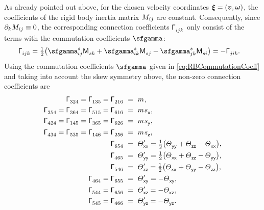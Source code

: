 As already pointed out above, for the chosen velocity coordinates $\boldsymbol{\xi} = (\boldsymbol{v},\boldsymbol{\omega})$, the coefficients of the rigid body inertia matrix $M_{ij}$ are constant.  
Consequently, since $\partial_{k}M_{ij} \equiv 0$, the corresponding connection coefficients $\bodyConnCoeffL{}{}{\LidxI}{\LidxII}{\LidxIII}$ only consist of the terms with the commutation coefficients $\bodyBoltzSym{}{}{}$:
\begin{align}\label{eq:RBConnCoeff}
 \bodyConnCoeffL{}{}{\LidxI}{\LidxII}{\LidxIII} &= \tfrac{1}{2}\big(\bodyBoltzSym{\LidxV}{\LidxI}{\LidxII} \bodyInertiaMatCoeff{}{}{\LidxV\LidxIII} + \bodyBoltzSym{\LidxV}{\LidxI}{\LidxIII} \bodyInertiaMatCoeff{}{}{\LidxV\LidxII} - \bodyBoltzSym{\LidxV}{\LidxII}{\LidxIII} \bodyInertiaMatCoeff{}{}{\LidxV\LidxI} \big)
 = -\bodyConnCoeffL{}{}{\LidxII}{\LidxI}{\LidxIII}.
\end{align}
Using the commutation coefficients $\bodyBoltzSym{}{}{}$ given in \eqref{eq:RBCommutationCoeff} and taking into account the skew symmetry above, the non-zero connection coefficients are
\begin{subequations}\label{eq:RBConnCoeffRes}
\begin{align}
 \bodyConnCoeffL{}{}{3}{2}{4} = \bodyConnCoeffL{}{}{1}{3}{5} = \bodyConnCoeffL{}{}{2}{1}{6} \ &= \ \bodyMass{}{},
\\
 \bodyConnCoeffL{}{}{2}{5}{4} = \bodyConnCoeffL{}{}{3}{6}{4} = \bodyConnCoeffL{}{}{5}{1}{5} = \bodyConnCoeffL{}{}{6}{1}{6} \ &= \ \bodyMass{}{} \bodyCOMCoeff{}{}{\idxX},
\\
 \bodyConnCoeffL{}{}{4}{2}{4} = \bodyConnCoeffL{}{}{1}{4}{5} = \bodyConnCoeffL{}{}{3}{6}{5} = \bodyConnCoeffL{}{}{6}{2}{6} \ &= \ \bodyMass{}{} \bodyCOMCoeff{}{}{\idxY},
\\
 \bodyConnCoeffL{}{}{4}{3}{4} = \bodyConnCoeffL{}{}{5}{3}{5} = \bodyConnCoeffL{}{}{1}{4}{6} = \bodyConnCoeffL{}{}{2}{5}{6} \ &= \ \bodyMass{}{} \bodyCOMCoeff{}{}{\idxZ},
\\
 \bodyConnCoeffL{}{}{6}{5}{4} \ &= \ \bodyMOICoeffp{}{}{\idxX\idxX} = \tfrac{1}{2}\big( \bodyMOICoeff{}{}{\idxY\idxY} + \bodyMOICoeff{}{}{\idxZ\idxZ} - \bodyMOICoeff{}{}{\idxX\idxX} \big),
\\
 \bodyConnCoeffL{}{}{4}{6}{5} \ &= \ \bodyMOICoeffp{}{}{\idxY\idxY} = \tfrac{1}{2}\big( \bodyMOICoeff{}{}{\idxX\idxX} + \bodyMOICoeff{}{}{\idxZ\idxZ} - \bodyMOICoeff{}{}{\idxY\idxY} \big),
\\
 \bodyConnCoeffL{}{}{5}{4}{6} \ &= \ \bodyMOICoeffp{}{}{\idxZ\idxZ} = \tfrac{1}{2}\big( \bodyMOICoeff{}{}{\idxX\idxX} + \bodyMOICoeff{}{}{\idxY\idxY} - \bodyMOICoeff{}{}{\idxZ\idxZ} \big),
\\
 \bodyConnCoeffL{}{}{4}{6}{4} = \bodyConnCoeffL{}{}{6}{5}{5} \ &= \ \bodyMOICoeffp{}{}{\idxX\idxY} = -\bodyMOICoeff{}{}{\idxX\idxY},
\\
 \bodyConnCoeffL{}{}{5}{4}{4} = \bodyConnCoeffL{}{}{6}{5}{6} \ &= \ \bodyMOICoeffp{}{}{\idxX\idxZ} = -\bodyMOICoeff{}{}{\idxX\idxZ},
\\
 \bodyConnCoeffL{}{}{5}{4}{5} = \bodyConnCoeffL{}{}{4}{6}{6} \ &= \ \bodyMOICoeffp{}{}{\idxY\idxZ} = -\bodyMOICoeff{}{}{\idxY\idxZ}.
\end{align}
\end{subequations}
